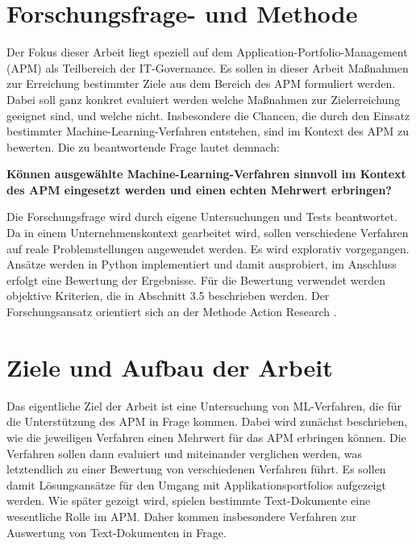 \section{Forschungsfrage- und Methode}

Der Fokus dieser Arbeit liegt speziell auf dem Application-Portfolio-Management (APM) als Teilbereich der IT-Governance. Es sollen in dieser Arbeit Maßnahmen zur Erreichung bestimmter Ziele aus dem Bereich des APM formuliert werden. Dabei soll ganz konkret evaluiert werden welche Maßnahmen zur Zielerreichung geeignet sind, und welche nicht. Insbesondere die Chancen, die durch den Einsatz bestimmter Machine-Learning-Verfahren entstehen, sind im Kontext des APM zu bewerten. Die zu beantwortende Frage lautet demnach: 

{\bf Können ausgewählte Machine-Learning-Verfahren sinnvoll im Kontext des APM eingesetzt werden und einen echten Mehrwert erbringen?}

Die Forschungsfrage wird durch eigene Untersuchungen und Tests beantwortet. Da in einem Unternehmenskontext gearbeitet wird, sollen verschiedene Verfahren auf reale Problemstellungen angewendet werden. Es wird explorativ vorgegangen. Ansätze werden in Python implementiert und damit ausprobiert, im Anschluss erfolgt eine Bewertung der Ergebnisse. Für die Bewertung verwendet werden objektive Kriterien, die in Abschnitt 3.5 beschrieben werden. Der Forschungsansatz orientiert sich an der Methode Action Research \cite{Avison}. 


\section{Ziele und Aufbau der Arbeit}

Das eigentliche Ziel der Arbeit ist eine Untersuchung von ML-Verfahren, die für die Unterstützung des APM in Frage kommen. Dabei wird zunächst beschrieben, wie die jeweiligen Verfahren einen Mehrwert für das APM erbringen können. Die Verfahren sollen dann evaluiert und miteinander verglichen werden, was letztendlich zu einer Bewertung von verschiedenen Verfahren führt. Es sollen damit Lösungsansätze für den Umgang mit Applikationsportfolios aufgezeigt werden. Wie später gezeigt wird, spielen bestimmte Text-Dokumente eine wesentliche Rolle im APM. Daher kommen insbesondere Verfahren zur Auswertung von Text-Dokumenten in Frage. 

